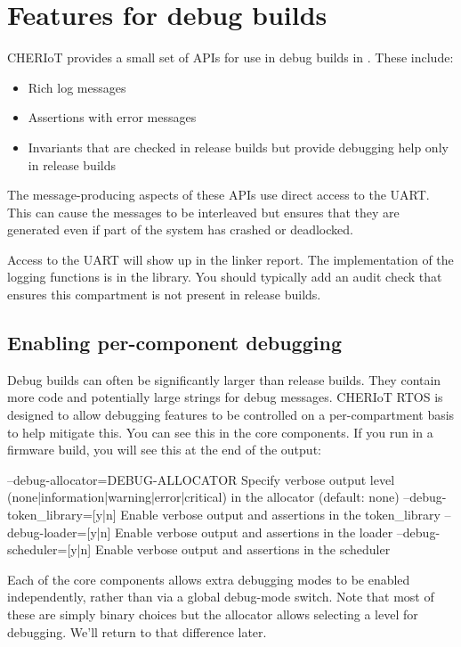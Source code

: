 \chapter[label=debug]{Features for debug builds}

CHERIoT provides a small set of APIs for use in debug builds in .
These include:

\begin{itemize}
	\item{Rich log messages}
	\item{Assertions with error messages}
	\item{Invariants that are checked in release builds but provide debugging help only in release builds}
\end{itemize}

The message-producing aspects of these APIs use direct access to the UART.
This can cause the messages to be interleaved but ensures that they are generated even if part of the system has crashed or deadlocked.

Access to the UART will show up in the linker report.
The implementation of the logging functions is in the  library.
You should typically add an audit check that ensures this compartment is not present in release builds.

\section{Enabling per-component debugging}

Debug builds can often be significantly larger than release builds.
They contain more code and potentially large strings for debug messages.
CHERIoT RTOS is designed to allow debugging features to be controlled on a per-compartment basis to help mitigate this.
You can see this in the core components.
If you run  in a firmware build, you will see this at the end of the output:

\begin{console}
--debug-allocator=DEBUG-ALLOCATOR Specify verbose output level (none|information|warning|error|critical) in the allocator (default: none)
--debug-token_library=[y|n] Enable verbose output and assertions in the token_library
--debug-loader=[y|n]        Enable verbose output and assertions in the loader
--debug-scheduler=[y|n]     Enable verbose output and assertions in the scheduler
\end{console}

Each of the core components allows extra debugging modes to be enabled independently, rather than via a global debug-mode switch.
Note that most of these are simply binary choices but the allocator allows selecting a level for debugging.
We'll return to that difference later.

